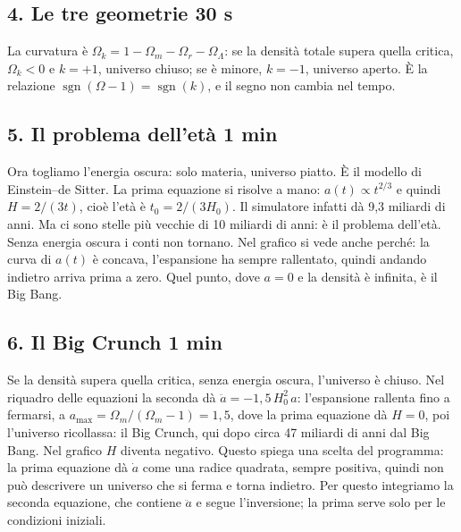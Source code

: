 \subsection*{4. Le tre geometrie \hfill\normalfont\small 30 s}
La curvatura è $\Omega_k = 1 - \Omega_m - \Omega_r - \Omega_\Lambda$: se la densità totale supera quella critica, $\Omega_k < 0$ e $k = +1$, universo chiuso; se è minore, $k = -1$, universo aperto. È la relazione $\operatorname{sgn}(\Omega - 1) = \operatorname{sgn}(k)$, e il segno non cambia nel tempo.

\subsection*{5. Il problema dell'età \hfill\normalfont\small 1 min}
Ora togliamo l'energia oscura: solo materia, universo piatto. È il modello di Einstein--de Sitter. La prima equazione si risolve a mano: $a(t) \propto t^{2/3}$ e quindi $H = 2/(3t)$, cioè l'età è $t_0 = 2/(3H_0)$.
Il simulatore infatti dà 9,3 miliardi di anni. Ma ci sono stelle più vecchie di 10 miliardi di anni: è il problema dell'età. Senza energia oscura i conti non tornano.
Nel grafico si vede anche perché: la curva di $a(t)$ è concava, l'espansione ha sempre rallentato, quindi andando indietro arriva prima a zero. Quel punto, dove $a = 0$ e la densità è infinita, è il Big Bang.

\subsection*{6. Il Big Crunch \hfill\normalfont\small 1 min}
Se la densità supera quella critica, senza energia oscura, l'universo è chiuso. Nel riquadro delle equazioni la seconda dà $\ddot a = -1{,}5\,H_0^2\,a$: l'espansione rallenta fino a fermarsi, a $a_{\max} = \Omega_m/(\Omega_m - 1) = 1{,}5$, dove la prima equazione dà $H = 0$, poi l'universo ricollassa: il Big Crunch, qui dopo circa 47 miliardi di anni dal Big Bang. Nel grafico $H$ diventa negativo.
Questo spiega una scelta del programma: la prima equazione dà $\dot a$ come una radice quadrata, sempre positiva, quindi non può descrivere un universo che si ferma e torna indietro. Per questo integriamo la seconda equazione, che contiene $\ddot a$ e segue l'inversione; la prima serve solo per le condizioni iniziali.

